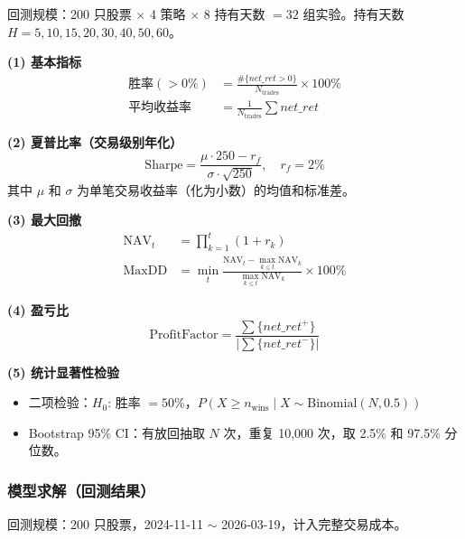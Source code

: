 \documentclass[12pt,a4paper]{ctexart}
\numberwithin{figure}{section}
\numberwithin{table}{section}
\begin{document}
回测规模：200 只股票 $\times$ 4 策略 $\times$ 8 持有天数 $=32$ 组实验。持有天数 $H = 5, 10, 15, 20, 30, 40, 50, 60$。

\noindent\textbf{(1) 基本指标}
\begin{align}
    \text{胜率}(>0\%) &= \frac{\#\{\mathit{net\_ret} > 0\}}{N_{\text{trades}}} \times 100\% \\
    \text{平均收益率} &= \frac{1}{N_{\text{trades}}} \sum \mathit{net\_ret}
\end{align}

\noindent\textbf{(2) 夏普比率（交易级别年化）}
\begin{equation}
    \text{Sharpe} = \frac{\mu \cdot 250 - r_f}{\sigma \cdot \sqrt{250}}, \quad r_f = 2\%
\end{equation}
其中 $\mu$ 和 $\sigma$ 为单笔交易收益率（化为小数）的均值和标准差。

\noindent\textbf{(3) 最大回撤}
\begin{align}
    \text{NAV}_t &= \prod_{k=1}^{t} (1 + r_k) \\
    \text{MaxDD} &= \min_t \frac{\text{NAV}_t - \max_{k\le t} \text{NAV}_k}{\max_{k\le t} \text{NAV}_k} \times 100\%
\end{align}

\noindent\textbf{(4) 盈亏比}
\begin{equation}
    \text{ProfitFactor} = \frac{\sum\{\mathit{net\_ret}^+\}}{\bigl|\sum\{\mathit{net\_ret}^-\}\bigr|}
\end{equation}

\noindent\textbf{(5) 统计显著性检验}
\begin{itemize}[leftmargin=*]
    \item 二项检验：$H_0$: 胜率 $= 50\%$，$P(X \ge n_{\text{wins}} \mid X \sim \text{Binomial}(N, 0.5))$
    \item Bootstrap 95\% CI：有放回抽取 $N$ 次，重复 10,000 次，取 2.5\% 和 97.5\% 分位数。
\end{itemize}

\subsubsection{模型求解（回测结果）}

回测规模：200 只股票，2024-11-11 $\sim$ 2026-03-19，计入完整交易成本。

\vspace{0.3cm}

\newcommand{\strattable}[2]{%
\vspace{0.3cm}
\noindent\textbf{#1}
\begin{center}
\footnotesize
\begin{tabularx}{\textwidth}{c c c c c c c c c}
\toprule
$H$ & 交易次数 & 胜率($>$0\%) & 胜率($>$1\%) & 均收益(\%) & 夏普 & 最大回撤(\%) & 盈亏比 & $p$值 \\
\midrule
#2
\bottomrule
\end{tabularx}
\end{center}
}
\end{document}
